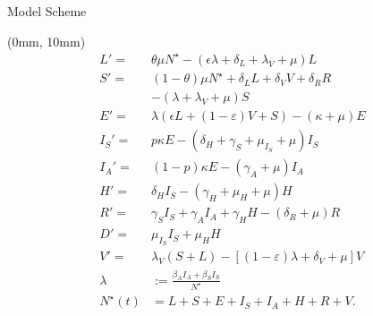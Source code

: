 \begin{frame}{Model Scheme}
    \setlength{\leftmargini}{1mm}
    \begin{textblock*}{65mm}(0mm, 10mm)
        \begin{equation*}
            \begin{aligned}
                L' =
                     &  \theta \mu N^{\star}
                     -(\epsilon \lambda + \delta_L + \lambda_V +\mu) L
             \\
                 S' =&
                     (1 - \theta) \mu N^\star
                     + \delta_L L
                     + \delta_V V
                     + \delta_R R
             \\
                 &-
                 \left(
                     \lambda + \lambda_V + \mu
                 \right) S
             \\
                 E' =&
                     \lambda (\epsilon L + (1-\varepsilon) V + S)
                  - (\kappa + \mu) E
             \\
                 I_S' =&
                     p \kappa E
                     -
                     (
                         \delta_H +
                         \gamma_S +
                         \mu_{I_S} +
                         \mu
                     ) I_S
             \\
                 I_A' = &
                     (1 - p) \kappa E - (\gamma_A + \mu) I_A
             \\
                 H' = &
                     \delta_H I_S - (\gamma_H + \mu_H + \mu) H
             \\
                 R' = &
                     \gamma_S I_S +
                     \gamma_A I_A +
                     \gamma_H H
                     - (\delta_R + \mu) R
             \\
                 D'  = &
                     \mu_{I_S} I_S + \mu_H H
             \\
                 V' = &
                     \lambda_V  (S + L)
                     - \left[
                         (1 - \varepsilon) \lambda
                         + \delta_V
                         + \mu
                     \right ] V
             \\
                 \lambda &:=
                     \frac{\beta_A I_A + \beta_S I_S}{N^{\star}}
             \\
                 N^{\star}(t) &=
                     L + S +E + I_S + I_A +
                  H + R + V .
            \end{aligned}
        \end{equation*}
    \end{textblock*}


\end{frame}
